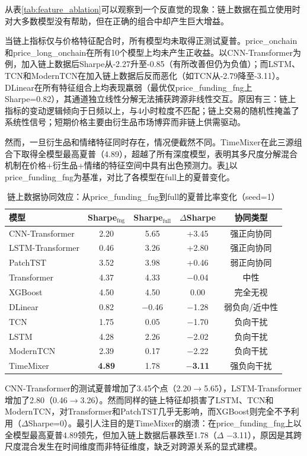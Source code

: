 \documentclass[12pt,a4paper]{ctexart}
\begin{document}
从表\ref{tab:feature_ablation}可以观察到一个反直觉的现象：链上数据在孤立使用时对大多数模型没有帮助，但在正确的组合中却产生巨大增益。

当链上指标仅与价格特征配合时，所有模型均未取得正测试夏普。price\_onchain和price\_long\_onchain在所有10个模型上均未产生正收益。以CNN-Transformer为例，加入链上数据后Sharpe从-2.27升至-0.85（有所改善但仍为负值）；而LSTM、TCN和ModernTCN在加入链上数据后反而恶化（如TCN从-2.79降至-3.11）。DLinear在所有特征组合上均表现羸弱（最优仅price\_funding\_fng上Sharpe=0.82），其通道独立线性分解无法捕获跨源非线性交互。原因有三：链上指标的变动逻辑倾向于日频以上，与4小时粒度不匹配；链上交易的随机性掩盖了系统性信号；短期价格主要由衍生品市场博弈而非链上供需驱动。

然而，一旦衍生品和情绪特征同时存在，情况便截然不同。TimeMixer在此三源组合下取得全模型最高夏普（4.89），超越了所有深度模型，表明其多尺度分解混合机制在价格+衍生品+情绪的特征空间中具有出色预测力。表\ref{tab:onchain_synergy}以price\_funding\_fng为基准，对比了各模型在full上的夏普变化。

\begin{table}[H]
\centering
\caption{链上数据协同效应：从price\_funding\_fng到full的夏普比率变化（seed=1）}
\label{tab:onchain_synergy}
\small
\begin{tabular}{lcccc}
\toprule
模型 & Sharpe$_{\text{fng}}$ & Sharpe$_{\text{full}}$ & $\Delta$Sharpe & 协同类型 \\
\midrule
CNN-Transformer & 2.20 & 5.65 & +3.45 & 强正向协同 \\
LSTM-Transformer & 0.46 & 3.26 & +2.80 & 强正向协同 \\
PatchTST & 3.52 & 3.98 & +0.46 & 弱正向协同 \\
Transformer & 4.37 & 4.33 & $-$0.04 & 中性 \\
XGBoost & 4.50 & 4.50 & 0.00 & 完全无视 \\
DLinear & 0.82 & $-$0.46 & $-$1.28 & 弱负向/近中性 \\
TCN & 1.75 & 0.05 & $-$1.70 & 负向干扰 \\
LSTM & 4.28 & 2.26 & $-$2.02 & 负向干扰 \\
ModernTCN & 2.39 & 0.17 & $-$2.22 & 负向干扰 \\
TimeMixer & \bfseries4.89 & 1.78 & \bfseries$-$3.11 & 强负向干扰 \\
\bottomrule
\end{tabular}
\end{table}

CNN-Transformer的测试夏普增加了3.45个点（2.20$\to$5.65），LSTM-Transformer增加了2.80（0.46$\to$3.26）。然而同样的链上特征却损害了LSTM、TCN和ModernTCN，对Transformer和PatchTST几乎无影响，而XGBoost则完全不予利用（$\Delta$Sharpe=0）。最引人注目的是TimeMixer的崩溃：在price\_funding\_fng上以全模型最高夏普4.89领先，但加入链上数据后暴跌至1.78（$\Delta$ $-$3.11），原因是其跨尺度混合发生在时间维度而非特征维度，缺乏对跨源关系的显式建模。
\end{document}
